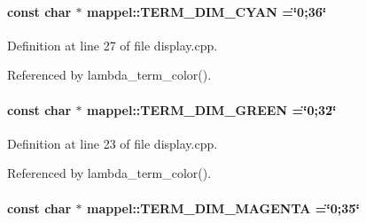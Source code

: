 \paragraph[{\texorpdfstring{T\+E\+R\+M\+\_\+\+D\+I\+M\+\_\+\+C\+Y\+AN}{TERM_DIM_CYAN}}]{\setlength{\rightskip}{0pt plus 5cm}const char $\ast$ mappel\+::\+T\+E\+R\+M\+\_\+\+D\+I\+M\+\_\+\+C\+Y\+AN =\char`\"{}0;36\char`\"{}}\hypertarget{namespacemappel_ad168ab0229814251071c6680e9792b0f}{}\label{namespacemappel_ad168ab0229814251071c6680e9792b0f}


Definition at line 27 of file display.\+cpp.



Referenced by lambda\+\_\+term\+\_\+color().

\paragraph[{\texorpdfstring{T\+E\+R\+M\+\_\+\+D\+I\+M\+\_\+\+G\+R\+E\+EN}{TERM_DIM_GREEN}}]{\setlength{\rightskip}{0pt plus 5cm}const char $\ast$ mappel\+::\+T\+E\+R\+M\+\_\+\+D\+I\+M\+\_\+\+G\+R\+E\+EN =\char`\"{}0;32\char`\"{}}\hypertarget{namespacemappel_af35fa592f92c75d4190e1b5aff9fbcfe}{}\label{namespacemappel_af35fa592f92c75d4190e1b5aff9fbcfe}


Definition at line 23 of file display.\+cpp.



Referenced by lambda\+\_\+term\+\_\+color().

\paragraph[{\texorpdfstring{T\+E\+R\+M\+\_\+\+D\+I\+M\+\_\+\+M\+A\+G\+E\+N\+TA}{TERM_DIM_MAGENTA}}]{\setlength{\rightskip}{0pt plus 5cm}const char $\ast$ mappel\+::\+T\+E\+R\+M\+\_\+\+D\+I\+M\+\_\+\+M\+A\+G\+E\+N\+TA =\char`\"{}0;35\char`\"{}}\hypertarget{namespacemappel_add36264e8025d4db88e03897ecda89b5}{}\label{namespacemappel_add36264e8025d4db88e03897ecda89b5}


